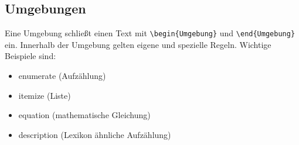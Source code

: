 \documentclass[10pt]{article}  %
\begin{document}
    \subsection{Umgebungen}
    Eine Umgebung schließt einen Text mit \verb!\begin{Umgebung}! und \verb!\end{Umgebung}! ein. Innerhalb der Umgebung gelten eigene und spezielle Regeln. Wichtige Beispiele sind:
    \begin{itemize}
        \item enumerate (Aufzählung)
        \item itemize (Liste)
        \item equation (mathematische Gleichung)
        \item description (Lexikon ähnliche Aufzählung)
    \end{itemize}
\end{document}
